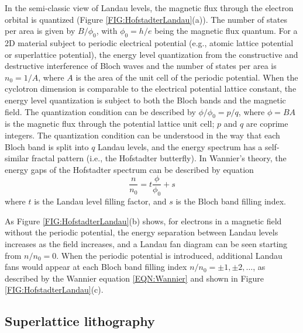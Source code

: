 \documentclass[pdflatex, sectionletters, 12pt]{pittetd}    %
\begin{document}
In the semi-classic view of Landau levels, the magnetic flux through the electron orbital is quantized (Figure \ref{FIG:HofstadterLandau}(a)). The number of states per area is given by $B/\phi_0$, with $\phi_0 = h/e$ being the magnetic flux quantum. For a 2D material subject to periodic electrical potential (e.g., atomic lattice potential or superlattice potential), the energy level quantization from the constructive and destructive interference of Bloch waves and the number of states per area is $n_0 = 1/A$, where $A$ is the area of the unit cell of the periodic potential\cite{hofstadter1976energy}. When the cyclotron dimension is comparable to the electrical potential lattice constant, the energy level quantization is subject to both the Bloch bands and the magnetic field. The quantization condition can be described by $\phi/\phi_0 = p/q$, where $\phi = BA$ is the magnetic flux through the potential lattice unit cell; $p$ and $q$ are coprime integers\cite{hofstadter1976energy}. The quantization condition can be understood in the way that each Bloch band is split into $q$ Landau levels, and the energy spectrum has a self-similar fractal pattern (i.e., the Hofstadter butterfly). In Wannier's theory\cite{wannier1978result}, the energy gaps of the Hofstadter spectrum can be described by equation 
\begin{equation}
\label{EQN:Wannier}
\frac{n}{n_0} = t\frac{\phi}{\phi_0} + s
\end{equation}
where $t$ is the Landau level filling factor, and $s$ is the Bloch band filling index\cite{streda1982quantised, thouless1984quantized}.

As Figure \ref{FIG:HofstadterLandau}(b) shows, for electrons in a magnetic field without the periodic potential, the energy separation between Landau levels increases as the field increases, and a Landau fan diagram can be seen starting from $n/n_0 = 0$. When the periodic potential is introduced, additional Landau fans would appear at each Bloch band filling index $n/n_0 = \pm 1, \pm 2, \ldots$, as described by the Wannier equation \ref{EQN:Wannier} and shown in Figure \ref{FIG:HofstadterLandau}(c). 

\subsection{Superlattice lithography}
\end{document}
